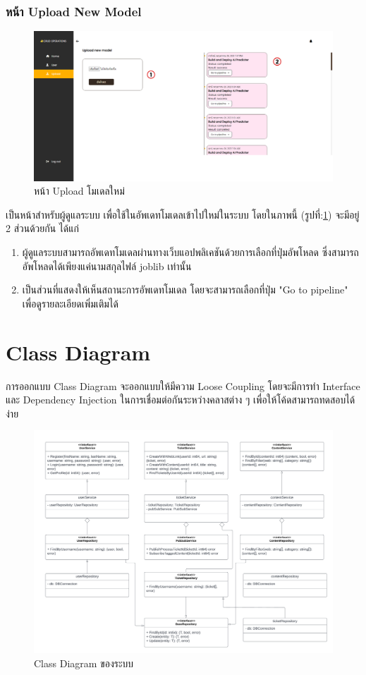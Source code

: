\documentclass[12pt,oneside,openright,a4paper]{cpe-thai-project}
\begin{document}
\subsubsection{หน้า Upload New Model}
\begin{figure}[!ht]\centering
  \includegraphics[width=15cm]{./img/project_ui/admin_up.png} 
  \caption{หน้า Upload โมเดลใหม่}\label{fig:admin_upload} 
\end{figure}
\hspace*{1cm}เป็นหน้าสำหรับผู้ดูแลระบบ เพื่อใช้ในอัพเดทโมเดลเข้าไปใหม่ในระบบ
โดยในภาพนี้ (รูปที่:\ref{fig:admin_upload}) จะมีอยู่ 2 ส่วนด้วยกัน ได้แก่
\begin{enumerate}
  \item ผู้ดูแลระบบสามารถอัพเดทโมเดลผ่านทางเว็บแอปพลิเคชันด้วยการเลือกที่ปุ่มอัพโหลด ซึ่งสามารถอัพโหลดได้เพียงแค่นามสกุลไฟล์ joblib เท่านั้น
  \item เป็นส่วนที่แสดงให้เห็นสถานะการอัพเดทโมเดล โดยจะสามารถเลือกที่ปุ่ม "Go to pipeline" เพื่อดูรายละเอียดเพิ่มเติมได้
\end{enumerate}
\newpage
\section{Class Diagram}
  \hspace{1cm}การออกแบบ Class Diagram จะออกแบบให้มีความ Loose Coupling โดยจะมีการทำ Interface และ Dependency Injection ในการเชื่อมต่อกันระหว่างคลาสต่าง ๆ
  เพื่อให้โค้ดสามารถทดสอบได้ง่าย
\begin{figure}[!ht]\centering
  \includegraphics[width=15cm]{./img/class_dia.png} 
  \caption{Class Diagram ของระบบ}\label{fig:class_diagram} 
\end{figure} 
\end{document}
